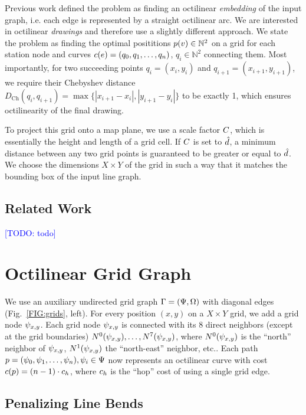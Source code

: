 \documentclass[sigconf]{acmart}
\newcommand\TODO[1]{\textcolor{blue}{\small [TODO: #1]}}
\begin{document}
Previous work defined the problem as finding an octilinear \emph{embedding} of the input graph, i.e. each edge is represented by a straight octilinear arc.
We are interested in octilinear \emph{drawings} and therefore use a slightly different approach.
We state the problem as finding the optimal posititions $p(v) \in \mathbb{N}^2$ on a grid for each station node and curves $c(e) = (q_0, q_1, \dots, q_n)$, $q_i \in \mathbb{N}^2$ connecting them. 
Most importantly, for two succeeding points $q_i = (x_i, y_i)$ and $q_{i+1} = (x_{i+1}, y_{i+1})$, we require their Chebyshev distance $D_\text{Ch}(q_i, q_{i+1}) = \max \{|x_{i+1} - x_i|, |y_{i+1} - y_i|\}$ to be exactly 1, which ensures octilinearity of the final drawing.

To project this grid onto a map plane, we use a scale factor $C$, which is essentially the height and length of a grid cell.
If $C$ is set to $\hat d$, a minimum distance between any two grid points is guaranteed to be greater or equal to $\hat d$.
We choose the dimensions $X\times Y$ of the grid in such a way that it matches the bounding box of the input line graph.

\subsection{Related Work}

\TODO{todo}

\section{Octilinear Grid Graph}
\label{SEC:gridgraph}

We use an auxiliary undirected grid graph $\Gamma = (\Psi, \Omega)$ with diagonal edges (Fig.~\ref{FIG:grids}, left).
For every position $(x, y)$ on a $X\times Y$ grid, we add a grid node $\psi_{x, y}$.
Each grid node $\psi_{x, y}$ is connected with its 8 direct neighbors (except at the grid boundaries) $N^0(\psi_{x, y}), \dots, N^7(\psi_{x, y})$, where $N^0(\psi_{x, y})$ is the ``north'' neighbor of $\psi_{x, y}$, $N^1(\psi_{x, y})$ the ``north-east'' neighbor, etc..
Each path $p = (\psi_0, \psi_1, \dots, \psi_n), \psi_i \in \Psi$ now represents an octilinear curve with cost $c(p) = (n - 1) \cdot c_h$, where $c_h$ is the ``hop'' cost of using a single grid edge.

\subsection{Penalizing Line Bends}
\end{document}
